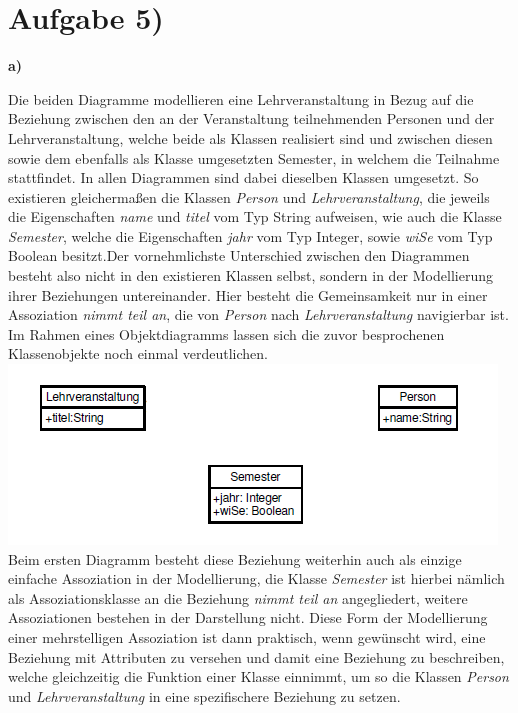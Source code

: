 \documentclass{swp1}
\begin{document}
\section*{Aufgabe 5)}

\textbf{a)}\newline

Die beiden Diagramme modellieren eine Lehrveranstaltung in Bezug auf die Beziehung zwischen den an der Veranstaltung teilnehmenden Personen und der Lehrveranstaltung, welche beide als Klassen realisiert sind und zwischen diesen sowie dem ebenfalls als Klasse umgesetzten Semester, in welchem die Teilnahme stattfindet. In allen Diagrammen sind dabei dieselben Klassen umgesetzt. So existieren gleichermaßen die Klassen \emph{Person} und \emph{Lehrveranstaltung}, die jeweils die Eigenschaften \emph{name} und \emph{titel} vom Typ String aufweisen, wie auch die Klasse \emph{Semester}, welche die Eigenschaften \emph{jahr} vom Typ Integer, sowie \emph{wiSe} vom Typ Boolean besitzt.Der vornehmlichste Unterschied zwischen den Diagrammen besteht also nicht in den existieren Klassen selbst, sondern in der Modellierung ihrer Beziehungen untereinander. Hier besteht die Gemeinsamkeit nur in einer Assoziation \emph{nimmt teil an}, die von \emph{Person} nach \emph{Lehrveranstaltung} navigierbar ist.\newline
\newline
Im Rahmen eines Objektdiagramms lassen sich die zuvor besprochenen Klassenobjekte noch einmal verdeutlichen.\newline
\newline
\includegraphics{Objektdiagramm}
\newline
Beim ersten Diagramm besteht diese Beziehung weiterhin auch als einzige einfache Assoziation in der Modellierung, die Klasse \emph{Semester} ist hierbei nämlich als Assoziationsklasse an die Beziehung \emph{nimmt teil an} angegliedert, weitere Assoziationen bestehen in der Darstellung nicht. Diese Form der Modellierung einer mehrstelligen Assoziation ist dann praktisch, wenn gewünscht wird, eine Beziehung mit Attributen zu versehen und damit eine Beziehung zu beschreiben, welche gleichzeitig die Funktion einer Klasse einnimmt, um so die Klassen \emph{Person} und \emph{Lehrveranstaltung} in eine spezifischere Beziehung zu setzen.\newline
\end{document}
